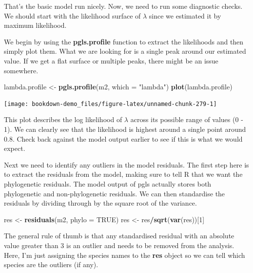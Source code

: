 \documentclass[
]{book}
\newenvironment{Shaded}{\begin{snugshade}}{\end{snugshade}}
\newcommand{\DataTypeTok}[1]{\textcolor[rgb]{0.13,0.29,0.53}{#1}}
\newcommand{\DecValTok}[1]{\textcolor[rgb]{0.00,0.00,0.81}{#1}}
\newcommand{\KeywordTok}[1]{\textcolor[rgb]{0.13,0.29,0.53}{\textbf{#1}}}
\newcommand{\NormalTok}[1]{#1}
\newcommand{\OperatorTok}[1]{\textcolor[rgb]{0.81,0.36,0.00}{\textbf{#1}}}
\newcommand{\OtherTok}[1]{\textcolor[rgb]{0.56,0.35,0.01}{#1}}
\newcommand{\StringTok}[1]{\textcolor[rgb]{0.31,0.60,0.02}{#1}}
\begin{document}
That's the basic model run nicely. Now, we need to run some diagnostic checks. We should start with the likelihood surface of \(\lambda\) since we estimated it by maximum likelihood.

We begin by using the \textbf{pgls.profile} function to extract the likelihoods and then simply plot them. What we are looking for is a single peak around our estimated value. If we get a flat surface or multiple peaks, there might be an issue somewhere.

\begin{Shaded}
\begin{Highlighting}[]
\NormalTok{lambda.profile \textless{}{-}}\StringTok{ }\KeywordTok{pgls.profile}\NormalTok{(m2, }\DataTypeTok{which =} \StringTok{"lambda"}\NormalTok{)}
\KeywordTok{plot}\NormalTok{(lambda.profile)}
\end{Highlighting}
\end{Shaded}

\begin{center}\texttt{[image: bookdown-demo\_files/figure-latex/unnamed-chunk-279-1]} \end{center}

This plot describes the log likelihood of \(\lambda\) across its possible range of values (0 - 1). We can clearly see that the likelihood is highest around a single point around 0.8. Check back against the model output earlier to see if this is what we would expect.

Next we need to identify any outliers in the model residuals. The first step here is to extract the residuals from the model, making sure to tell R that we want the phylogenetic residuals. The model output of pgls actually stores both phylogenetic and non-phylogenetic residuals. We can then standardise the residuals by dividing through by the square root of the variance.

\begin{Shaded}
\begin{Highlighting}[]
\NormalTok{res \textless{}{-}}\StringTok{ }\KeywordTok{residuals}\NormalTok{(m2, }\DataTypeTok{phylo =} \OtherTok{TRUE}\NormalTok{)}
\NormalTok{res \textless{}{-}}\StringTok{ }\NormalTok{res}\OperatorTok{/}\KeywordTok{sqrt}\NormalTok{(}\KeywordTok{var}\NormalTok{(res))[}\DecValTok{1}\NormalTok{]}
\end{Highlighting}
\end{Shaded}

The general rule of thumb is that any standardised residual with an absolute value greater than 3 is an outlier and needs to be removed from the analysis. Here, I'm just assigning the species names to the \textbf{res} object so we can tell which species are the outliers (if any).
\end{document}
